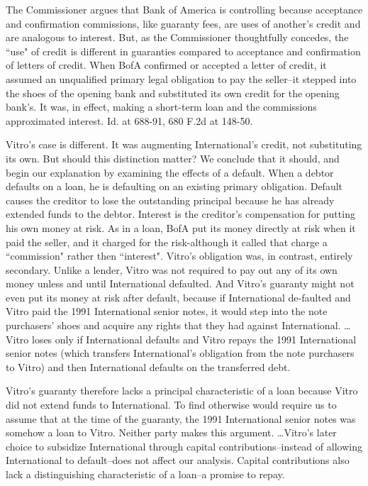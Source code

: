 \begin{select}
The Commissioner argues that Bank of America is controlling because acceptance and confirmation commissions, like guaranty fees, are uses of another's credit and are analogous to interest. But, as the Commissioner thoughtfully concedes, the ``use" of credit is different in guaranties compared to acceptance and confirmation of letters of credit. When BofA confirmed or accepted a letter of credit, it assumed an unqualified primary legal obligation to pay the seller--it stepped into the shoes of the opening bank and substituted its own credit for the opening bank's. It was, in effect, making a short-term loan and the commissions approximated interest. Id. at 688-91, 680 F.2d at 148-50.

Vitro's case is different. It was augmenting International's credit, not substituting its own. But should this distinction matter? We conclude that it  should, and begin our explanation by examining the effects of a default. When a debtor defaults on a loan, he is defaulting on an existing primary obligation. Default causes the creditor to lose the outstanding principal because he has already extended funds to the debtor. Interest is the creditor's compensation for putting his own money at risk. As in a loan, BofA put its money directly at risk when it paid the seller, and it charged for the risk-although it called that charge a ``commission" rather then ``interest". Vitro's obligation was, in contrast, entirely secondary. Unlike a lender, Vitro was not required to pay out any of its own money unless and until International defaulted. And Vitro's guaranty might not even put its money at risk after default, because if International de-faulted and Vitro paid the 1991 International senior notes, it would step into the note purchasers' shoes and acquire any rights that they had against International. \ldots Vitro loses only if International defaults and Vitro repays the 1991 International senior notes (which transfers International's obligation from the note purchasers to Vitro) and then International defaults on the transferred debt.

Vitro's guaranty therefore lacks a principal characteristic of a loan because Vitro did not extend funds to International. To find otherwise would require us to assume that at the time of the guaranty, the 1991 International senior notes was somehow a loan to Vitro. Neither party makes this argument. \ldots Vitro's later choice to subsidize International through capital contributions--instead of allowing International to default--does not affect our analysis. Capital contributions also lack a distinguishing characteristic of a loan--a promise to repay.


\end{select}
